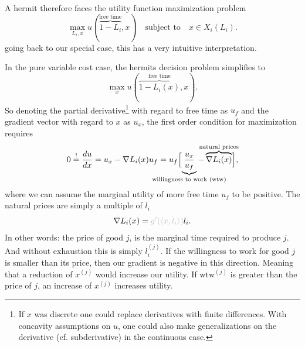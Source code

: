 A hermit therefore faces the utility function maximization problem
\[
	\max_{L_i, x} u(\overbrace{1-L_i}^{\text{free time}}, x)
	\quad\text{subject to}\quad x\in X_i(L_i).
\]
going back to our special case, this has a very intuitive interpretation.


\begin{example*}
	In the pure variable cost case, the hermits decision problem simplifies to
	\[
		\max_{x} u(\overbrace{1-L_i(x)}^{\text{free time}}, x).
	\]
	So denoting the partial derivative\footnote{
		If \(x\) was discrete one could replace derivatives with finite
		differences.  With concavity assumptions on \(u\), one could also make
		generalizations on the derivative (cf. subderivative) in the continuous
		case.
	}
	with regard to free time as \(u_f\) and
	the gradient vector with regard to \(x\) as \(u_x\), the first order
	condition for maximization requires
	\[
		0\overset!=\frac{du}{dx}
		= u_x - \nabla L_i(x) u_f
		= u_f \Bigl[
			\underbrace{\frac{u_x}{u_f}}_{\mathclap{\text{willingness to work (wtw)}}}
		- \overbrace{\nabla L_i(x)}^{\mathclap{\text{natural prices}}}
		\Bigr],
	\]
	where we can assume the marginal utility of more free time \(u_f\) to be
	positive. The natural prices are simply {\color{lightgray} a multiple of}
	\(l_i\)
	\[
		\nabla L_i(x) = {\color{lightgray} g'(\langle x, l_i\rangle) }l_i.
	\]
	In other words: the price of good \(j\), is the {\color{lightgray} marginal}
	time required to produce \(j\). And without exhaustion this is simply
	\(l^{(j)}_i\). If the willingness to work for good \(j\) is smaller than
	its price, then our gradient is negative in this direction. Meaning that
	a reduction of \(x^{(j)}\) would increase our utility. If \(\text{wtw}^{(j)}\) is
	greater than the price of \(j\), an increase of \(x^{(j)}\) increases utility.
\end{example*}
